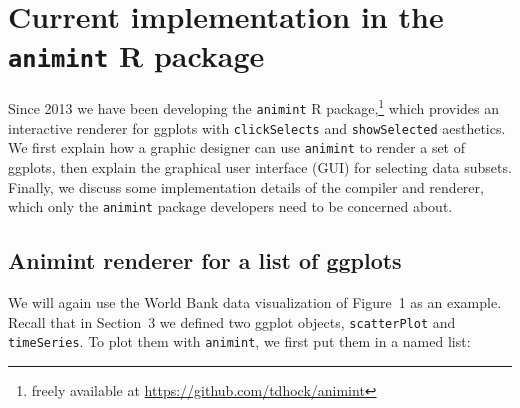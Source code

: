 \documentclass[journal]{vgtc}\usepackage[]{graphicx}\usepackage[]{color}
\begin{document}


\section{Current implementation in the \texttt{animint} R package}

Since 2013 we have been developing the \texttt{animint} R
package,\footnote{freely available at
  \url{https://github.com/tdhock/animint}} which provides an
interactive renderer for ggplots with \texttt{clickSelects} and
\texttt{showSelected} aesthetics. We first explain how a graphic
designer can use \texttt{animint} to render a set of ggplots, then explain the
graphical user interface (GUI) for selecting data subsets. Finally, we
discuss some implementation details of the compiler and renderer,
which only the \texttt{animint} package developers need to be concerned about.

\subsection{Animint renderer for a list of ggplots}

We will again use the World Bank data visualization of Figure~1 as an
example. Recall that in Section~3 we defined two ggplot objects,
\texttt{scatterPlot} and \texttt{timeSeries}. To plot them with
\texttt{animint}, we first put them in a named list:
\end{document}
